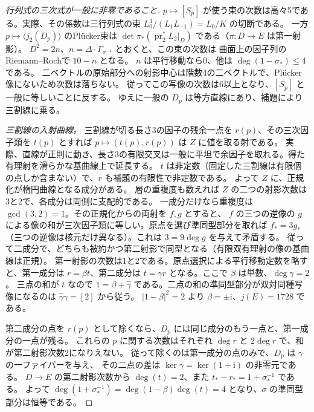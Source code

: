 \begin{proof}[行列式の三次式が一般に非零であること]
$p\mapsto [S_p]$ が使う束の次数は高々5である。実際、その係数は三行列式の束
$L_0^3/(L_1L_{-1})=L_0/K$ の切断である。
一方 $p\mapsto \langle j_2(D_p)\rangle$ のPlücker束は
$\det\pi_*(\operatorname{pr}_2^*L_2|_D)$ である（$\pi:D\to E$ は第一射影）。
$D^2=2n$、$n=\Delta\cdot\Gamma_{\sigma^{-1}}$ とおくと、この束の次数は
曲面上の因子列のRiemann--Rochで $10-n$ となる。
$n$ は平行移動なら0、他は $\deg(1-\sigma_*)\le4$ である。
二ベクトルの原始部分への射影中心は階数4の二ベクトルで、Plücker像にないため次数は落ちない。
従ってこの写像の次数は6以上となり、$[S_p]$ と一般に等しいことに反する。
ゆえに一般の $D_p$ は等方直線にあり、補題により三割線に乗る。

\smallskip
\noindent\textit{三割線の入射曲線。}
三割線が切る長さ3の因子の残余一点を $r(p)$、その三次因子類を $t(p)$ とすれば
$p\mapsto (t(p),r(p))$ は $Z$ に値を取る射である。
実際、直線が正則に動き、長さ3の有限交叉は一般に平坦で余因子を取れる。得た有理射を滑らかな基曲線上で延長する。
$t$ は非定数（固定した三割線は有限個の点しか含まない）で、$r$ も補題の有限性で非定数である。
よって $Z$ に、正規化が楕円曲線となる成分がある。
層の重複度も数えれば $Z$ の二つの射影次数は3と2で、各成分は両側に支配的である。
一成分だけなら重複度は $\gcd(3,2)=1$。その正規化からの両射を $f,g$ とすると、
$f$ の三つの逆像の $g$ による像の和が三次因子類に等しい。原点を選び準同型部分を取れば
$f_*=3g_*$（三つの逆像は核元だけ異なる）。これは $3=9\deg g$ を与えて矛盾する。
従って二成分で、どちらも被約かつ第二射影で同型となる（有限双有理射の像の基曲線は正規）。
第一射影の次数は1と2である。原点選択による平行移動定数を略すと、第一成分は
$r=\beta t$、第二成分は $t=\gamma r$ となる。ここで $\beta$ は単数、$\deg\gamma=2$。
三点の和が $t$ なので $1=\beta+\widehat\gamma$ である。二点の和の準同型部分が双対同種写像になるのは
$\widehat\gamma\gamma=[2]$ から従う。
$|1-\beta|^2=2$ より $\beta=\pm\mathrm i$、$j(E)=1728$ である。

第二成分の点を $r(p)$ として除くなら、$D_p$ には同じ成分のもう一点と、第一成分の一点が残る。
これらの $p$ に関する次数はそれぞれ $\deg r$ と $2\deg r$ で、和が第二射影次数2になりえない。
従って除くのは第一成分の点のみで、$D_p$ は $\gamma$ の一ファイバーを与え、
その二点の差は $\ker\gamma=\ker(1+\mathrm i)$ の非零元である。
$D\to E$ の第二射影次数から $\deg(t)=2$、また $t_*-r_*=1+\sigma^{-1}_*$ である。
よって $\deg(1+\sigma^{-1}_*)=\deg(1-\beta)\deg(t)=4$ となり、$\sigma$ の準同型部分は恒等である。


\end{proof}
